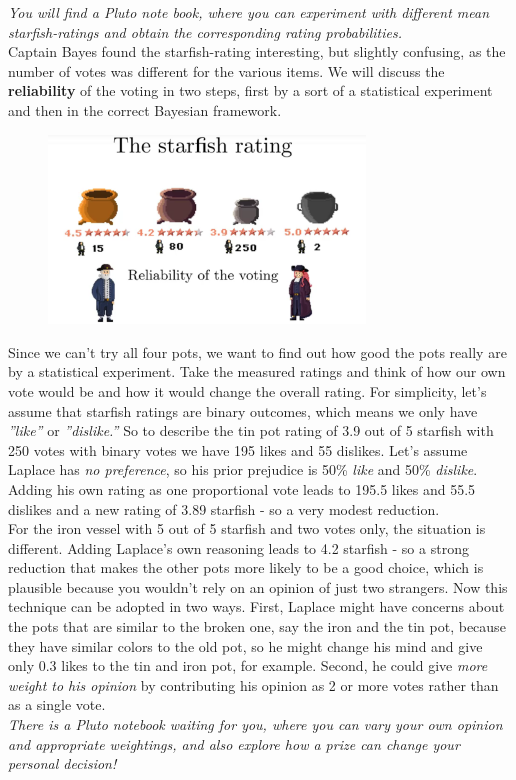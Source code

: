 \documentclass[12pt, a4paper]{scrartcl}
\begin{document}
\textit{You will ﬁnd a Pluto note book, where you can experiment with diﬀerent
mean starﬁsh-ratings and obtain the corresponding rating probabilities.}\\

Captain Bayes found the starﬁsh-rating interesting, but slightly confusing,
as the number of votes was diﬀerent for the various items. We will discuss
the \textbf{reliability} of the voting in two steps, ﬁrst by a sort of a statistical experiment and
then in the correct Bayesian framework.\\%
 \begin{figure}[H]
	\centering
	\includegraphics[width=0.75\textwidth]{6_9.png}
\end{figure}

Since we can’t try all four pots, we want to ﬁnd out how good the pots really are
by a statistical experiment.
Take the measured ratings and think of how our own vote would be and how
it would change the overall rating.
For simplicity, let’s assume that starﬁsh ratings are binary outcomes, which means we only have
\textit{”like”} or \textit{”dislike.”} So to describe the tin pot rating of 3.9 out of 5 starﬁsh
with 250 votes with binary votes we have 195 likes and 55 dislikes. Let’s
assume Laplace has \textit{no preference}, so his prior prejudice is 50\% \textit{like} and 50\%
\textit{dislike}. Adding his own rating as one proportional vote leads to 195.5 likes
and 55.5 dislikes and a new rating of 3.89 starﬁsh - so a very modest reduction.\\

For the iron vessel with 5 out of 5 starﬁsh and two votes only, the situation is
diﬀerent. Adding Laplace’s own reasoning leads to 4.2 starﬁsh - so a strong
reduction that makes the other pots more likely to be a good choice, which
is plausible because you wouldn’t rely on an opinion of just two strangers.
Now this technique can be adopted in two ways. First, Laplace might have
concerns about the pots that are similar to the broken one, say the iron and
the tin pot, because they have similar colors to the old pot, so he might
change his mind and give only 0.3 likes to the tin and iron pot, for example.
Second, he could give \textit{more weight to his opinion} by contributing his opinion
as 2 or more votes rather than as a single vote.\\
\textit{There is a Pluto notebook waiting for you, where you can vary your own
opinion and appropriate weightings, and also explore how a prize can change
your personal decision!}\\
\end{document}
